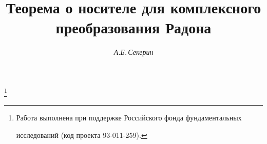 

 




\newcommand{\la}{\langle} 


\newcommand{\ra}{\rangle} 


\newcommand{\supp}{\operatorname{supp}} 


\newcommand{\conv}{\operatorname{conv}} 


 




 


\setcounter{page}{43} 












\author{\it А.Б.\,Секерин} 


\title{Теорема о носителе для комплексного\\ 


преобразования Радона} 


 


\thanks{Работа выполнена при поддержке Российского фонда фундаментальных 


исследований (код проекта 93-011-259).} 


\date{} 




 


\pagestyle{plain} %


 



